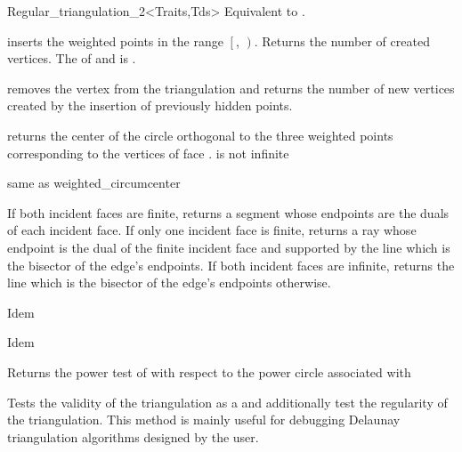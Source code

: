 \begin{ccRefClass}{Regular_triangulation_2<Traits,Tds>}
{Equivalent to .}

{inserts the weighted points in the range
 $\left[\right.$, $\left.\right)$.
 Returns the number of created vertices.
 \ccPrecond The  of  and 
 is .}

{removes the vertex from the triangulation and
returns the number of new vertices created by the insertion of previously
hidden points.}

{returns the center of the circle orthogonal to the three weighted
points corresponding to the vertices of face .
\ccPrecond {} is not infinite}

{same as weighted\_circumcenter}

{If both incident faces are finite, returns a segment whose endpoints are the
duals of each incident face. If only one incident face is finite, returns a
ray whose endpoint is the dual of the finite incident face and supported by
the line which is the bisector of the edge's endpoints. If both incident faces
are infinite, returns the line which is the bisector of the edge's endpoints
otherwise.  }

{Idem}

{Idem}



\ccPredicates
{}
\ccThreeToTwo

{Returns the power test of   with respect to the 
power circle  associated with }



\begin{ccAdvanced}

{ Tests the validity of the triangulation as a 
and additionally test the regularity of the triangulation. This method is
 mainly  useful for debugging Delaunay triangulation algorithms designed by
 the user.}
\end{ccAdvanced}





\end{ccRefClass}
